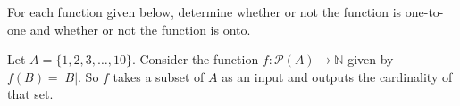 \documentclass[11pt]{exam}
\def\Z{\mathbb{Z}}
\def\N{\mathbb{N}}
\def\pow{\mathcal{P}}
\begin{document}
\begin{questions}
\begin{multicols}{2}

\end{multicols}


\question For each function given below, determine whether or not the function is one-to-one and whether or not the function is onto.

\question Let $A = \{1,2,3,\ldots,10\}$.  Consider the function $f:\pow(A) \to \N$ given by $f(B) = |B|$.  So $f$ takes a subset of $A$ as an input and outputs the cardinality of that set.  
\end{questions}
\end{document}
